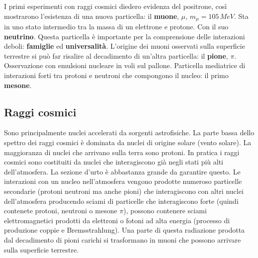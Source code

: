 I primi esperimenti con raggi cosmici diedero evidenza del positrone, così mostrarono l'esistenza di una nuova particella: il 
 \textbf{muone}, $\mu$, $m_\mu=105\,MeV$. Sta in uno stato intermedio tra la massa di un elettrone e protone. Con il suo \textbf{neutrino}. Questa particella è importante per la comprensione delle interazioni deboli: \textbf{famiglie} ed \textbf{universalità}. L'origine dei muoni osservati sulla superficie terrestre si può far risalire al decadimento di un'altra particella: il \textbf{pione}, $\pi$. Osservazione con emulsioni nucleare in voli sul pallone. Particella mediatrice di interazioni forti tra protoni e neutroni che compongono il nucleo: il primo \textbf{mesone}.
 \subsection{Raggi cosmici}
 Sono principalmente nuclei accelerati da sorgenti astrofisiche. La parte bassa dello spettro dei raggi cosmici è dominata da nuclei di origine solare (vento solare). La maggioranza di nuclei che arrivano sulla terra sono protoni. In pratica i raggi cosmici sono costituiti da nuclei che interagiscono già negli stati più alti dell'atmosfera. La sezione d'urto è abbastanza grande da garantire questo. Le interazioni con un nucleo nell'atmosfera vengono prodotte numeroso particelle secondarie (protoni neutroni ma anche pioni) che interagiscono con altri nuclei dell'atmosfera producendo sciami di particelle che interagiscono forte (quindi contenete protoni, neutroni o mesone $\pi$), possono contenere sciami elettromagnetici prodotti da elettroni o fotoni ad alta energia (processo di produzione coppie e Bremsstrahlung). Una parte di questa radiazione prodotta dal decadimento di pioni carichi si trasformano in muoni che possono arrivare sulla superficie terrestre. 

